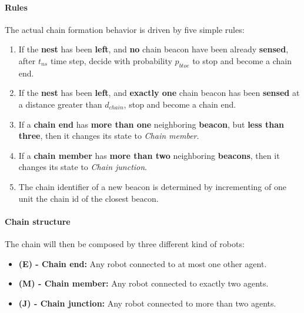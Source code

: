 \paragraph{Rules}\label{par:rules}
The actual chain formation behavior is driven by five simple rules:
\begin{enumerate}
  \item If the \textbf{nest} has been \textbf{left}, and \textbf{no} chain beacon have been already \textbf{sensed}, after $t_{ns}$ time step, decide with probability $p_{btoe}$ to stop and become a chain end.
  \item If the \textbf{nest} has been \textbf{left}, and \textbf{exactly one} chain beacon has been \textbf{sensed} at a distance greater than $d_{chain}$, stop and become a chain end.
  \item If a \textbf{chain end} has \textbf{more than one} neighboring\textbf{ beacon}, but \textbf{less than three}, then it changes its state to \emph{Chain member}.
  \item If a \textbf{chain member} has \textbf{more than two} neighboring \textbf{beacons}, then it changes its state to \emph{Chain junction}.
  \item The chain identifier of a new beacon is determined by incrementing of one unit the chain id of the closest beacon.
\end{enumerate}

\paragraph{Chain structure}
The chain will then be composed by three different kind of robots:
\begin{itemize}
  \item \textbf{(E) - Chain end:} Any robot connected to at most one other agent.
  \item \textbf{(M) - Chain member:} Any robot connected to exactly two agents.
  \item \textbf{(J) - Chain junction:} Any robot connected to more than two agents.
\end{itemize}

\begin{center}
\end{center}


